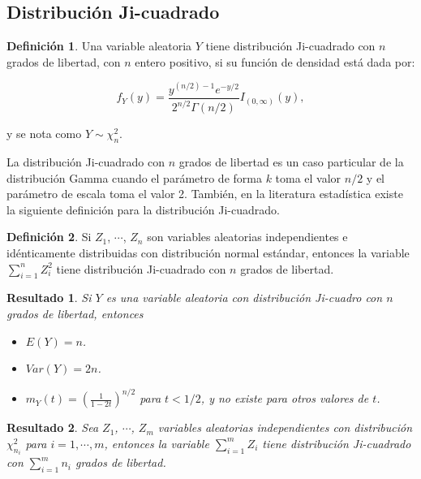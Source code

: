 \documentclass[
  10pt,
  spanish,
]{book}
\providecommand{\tightlist}{%
  \setlength{\itemsep}{0pt}\setlength{\parskip}{0pt}}
\newtheorem{proposition}{Resultado}[chapter]
\theoremstyle{definition}
\newtheorem{definition}{Definición}[chapter]
\theoremstyle{definition}
\theoremstyle{definition}
\theoremstyle{definition}
\theoremstyle{remark}
\begin{document}
\hypertarget{distribuciuxf3n-ji-cuadrado}{%
\subsection{Distribución Ji-cuadrado}\label{distribuciuxf3n-ji-cuadrado}}

\begin{definition}
\protect\hypertarget{def:unnamed-chunk-39}{}{\label{def:unnamed-chunk-39} }Una variable aleatoria \(Y\) tiene distribución Ji-cuadrado con \(n\) grados de libertad, con \(n\) entero positivo, si su función de densidad está dada por:

\begin{equation}
f_Y(y)=\frac{y^{(n/2)-1}e^{-y/2}}{2^{n/2}\Gamma(n/2)}I_{(0,\infty)}(y),
\end{equation}

y se nota como \(Y\sim\chi^2_n\).
\end{definition}

La distribución Ji-cuadrado con \(n\) grados de libertad es un caso particular de la distribución Gamma cuando el parámetro de forma \(k\) toma el valor \(n/2\) y el parámetro de escala toma el valor 2. También, en la literatura estadística existe la siguiente definición para la distribución Ji-cuadrado.

\begin{definition}
\protect\hypertarget{def:unnamed-chunk-40}{}{\label{def:unnamed-chunk-40} }Si \(Z_1\), \(\cdots\), \(Z_n\) son variables aleatorias independientes e idénticamente distribuidas con distribución normal estándar, entonces la variable \(\sum_{i=1}^nZ_i^2\) tiene distribución Ji-cuadrado con \(n\) grados de libertad.
\end{definition}

\begin{proposition}
\protect\hypertarget{prp:unnamed-chunk-41}{}{\label{prp:unnamed-chunk-41} }Si \(Y\) es una variable aleatoria con distribución Ji-cuadro con \(n\) grados de libertad, entonces

\begin{itemize}
\tightlist
\item
  \(E(Y)=n\).
\item
  \(Var(Y)=2n\).
\item
  \(m_Y(t)=\left(\frac{1}{1-2t}\right)^{n/2}\) para \(t<1/2\), y no existe para otros valores de \(t\).
\end{itemize}
\end{proposition}

\begin{proposition}
\protect\hypertarget{prp:unnamed-chunk-42}{}{\label{prp:unnamed-chunk-42} }Sea \(Z_1\), \(\cdots\), \(Z_m\) variables aleatorias independientes con distribución \(\chi^2_{n_i}\) para \(i=1,\cdots,m\), entonces la variable \(\sum_{i=1}^mZ_i\) tiene distribución Ji-cuadrado con \(\sum_{i=1}^mn_i\) grados de libertad.
\end{proposition}
\end{document}
